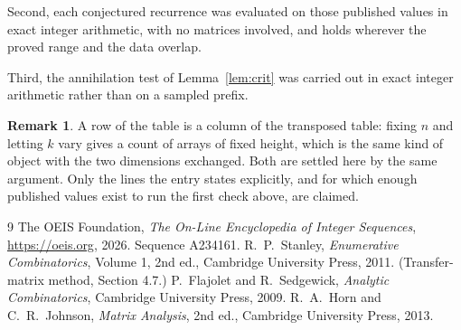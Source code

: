 \documentclass[11pt,a4paper]{article}
\theoremstyle{plain}
\theoremstyle{definition}
\newtheorem{remark}[theorem]{Remark}
\begin{document}
Second, each conjectured recurrence was evaluated on those published values in exact
integer arithmetic, with no matrices involved, and holds wherever the proved range and the
data overlap.

Third, the annihilation test of Lemma~\ref{lem:crit} was carried out in exact integer
arithmetic rather than on a sampled prefix.

\begin{remark}
A row of the table is a column of the transposed table: fixing $n$ and letting $k$ vary gives a
count of arrays of fixed height, which is the same kind of object with the two dimensions
exchanged. Both are settled here by the same argument. Only the lines the entry states
explicitly, and for which enough published values exist to run the first check above, are
claimed.
\end{remark}

\begin{thebibliography}{9}
 The OEIS Foundation, \emph{The On-Line Encyclopedia of Integer
Sequences}, \url{https://oeis.org}, 2026. Sequence A234161.
 R.~P.~Stanley, \emph{Enumerative Combinatorics}, Volume 1, 2nd ed.,
Cambridge University Press, 2011. (Transfer-matrix method, Section 4.7.)
 P.~Flajolet and R.~Sedgewick, \emph{Analytic Combinatorics}, Cambridge
University Press, 2009.
 R.~A.~Horn and C.~R.~Johnson, \emph{Matrix Analysis}, 2nd ed., Cambridge
University Press, 2013.
\end{thebibliography}
\end{document}
